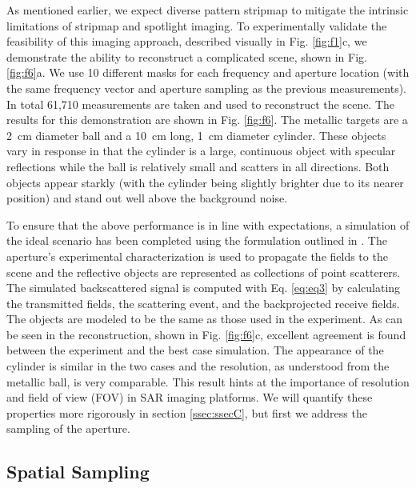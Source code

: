 \documentclass[journal]{IEEEtran}
\begin{document}
As mentioned earlier, we expect diverse pattern stripmap to mitigate the intrinsic limitations of stripmap and spotlight imaging. To experimentally validate the feasibility of this imaging approach, described visually in Fig. \ref{fig:f1}c, we demonstrate the ability to reconstruct a complicated scene, shown in Fig. \ref{fig:f6}a. We use 10 different masks for each frequency and aperture location (with the same frequency vector and aperture sampling as the previous measurements). In total 61,710 measurements are taken and used to reconstruct the scene. The results for this demonstration are shown in Fig. \ref{fig:f6}. The metallic targets are a \SI{2}{\centi\meter} diameter ball and a \SI{10}{\centi\meter} long, \SI{1}{\centi\meter} diameter cylinder. These objects vary in response in that the cylinder is a large, continuous object with specular reflections while the ball is relatively small and scatters in all directions. Both objects appear starkly (with the cylinder being slightly brighter due to its nearer position) and stand out well above the background noise.

To ensure that the above performance is in line with expectations, a simulation of the ideal scenario has been completed using the formulation outlined in \cite{lipworth2013JOSA}. The aperture's experimental characterization is used to propagate the fields to the scene and the reflective objects are represented as collections of point scatterers. The simulated backscattered signal is computed with Eq. \ref{eq:eq3} by calculating the transmitted fields, the scattering event, and the backprojected receive fields. The objects are modeled to be the same as those used in the experiment. As can be seen in the reconstruction, shown in Fig. \ref{fig:f6}c, excellent agreement is found between the experiment and the best case simulation. The appearance of the cylinder is similar in the two cases and the resolution, as understood from the metallic ball, is very comparable. This result hints at the importance of resolution and field of view (FOV) in SAR imaging platforms. We will quantify these properties more rigorously in section \ref{ssec:ssecC}, but first we address the sampling of the aperture.

\subsection{Spatial Sampling}
\label{ssec:ssecB}
\end{document}
